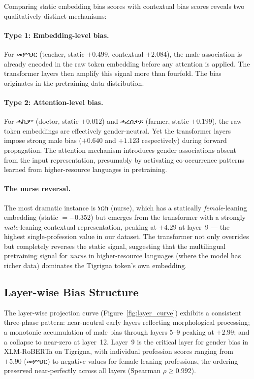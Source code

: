 \documentclass[11pt,a4paper]{article}
\begin{document}
Comparing static embedding bias scores with contextual bias scores reveals two
qualitatively distinct mechanisms:

\paragraph{Type 1: Embedding-level bias.}
For {\ethiopicfont መምህር} (teacher, static $+0.499$, contextual $+2.084$), the male
association is already encoded in the raw token embedding before any attention
is applied. The transformer layers then amplify this signal more than fourfold.
The bias originates in the pretraining data distribution.

\paragraph{Type 2: Attention-level bias.}
For {\ethiopicfont ሓኪም} (doctor, static $+0.012$) and {\ethiopicfont ሓረስታይ} (farmer, static
$+0.199$), the raw token embeddings are effectively gender-neutral. Yet the
transformer layers impose strong male bias ($+0.640$ and $+1.123$ respectively)
during forward propagation. The attention mechanism introduces gender
associations absent from the input representation, presumably by activating
co-occurrence patterns learned from higher-resource languages in pretraining.

\paragraph{The nurse reversal.}
The most dramatic instance is {\ethiopicfont ነርስ} (nurse), which has a statically
\emph{female}-leaning embedding (static $= -0.352$) but emerges from the
transformer with a strongly \emph{male}-leaning contextual representation,
peaking at $+4.29$ at layer~9 — the highest single-profession value in our
dataset. The transformer not only overrides but completely reverses the static
signal, suggesting that the multilingual pretraining signal for \textit{nurse}
in higher-resource languages (where the model has richer data) dominates the
Tigrigna token's own embedding.

\subsection{Layer-wise Bias Structure}

The layer-wise projection curve (Figure~\ref{fig:layer_curve}) exhibits a
consistent three-phase pattern: near-neutral early layers reflecting
morphological processing; a monotonic accumulation of male bias through layers
5--9 peaking at $+2.99$; and a collapse to near-zero at layer~12. Layer~9 is
the critical layer for gender bias in XLM-RoBERTa on Tigrigna, with individual
profession scores ranging from $+5.90$ ({\ethiopicfont መምህር}) to negative values for
female-leaning professions, the ordering preserved near-perfectly across all
layers (Spearman $\rho \geq 0.992$).
\end{document}
